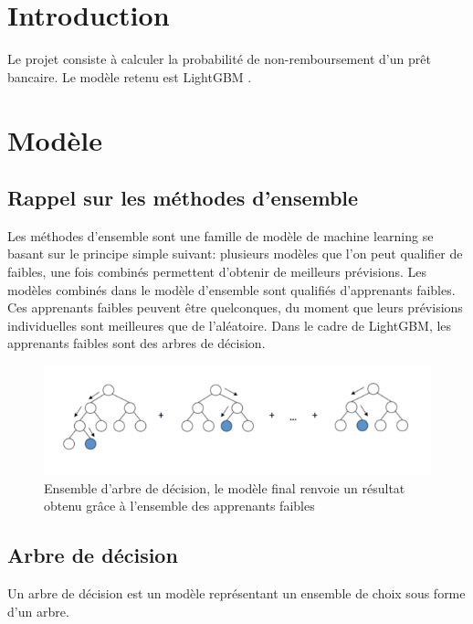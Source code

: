 
\section{Introduction}
	Le projet consiste à calculer la probabilité de non-remboursement d'un prêt bancaire.
	Le modèle retenu est LightGBM \cite{NIPS2017_6907}.
	

\section{Modèle}
	
	\subsection{Rappel sur les méthodes d'ensemble}
		Les méthodes d'ensemble sont une famille de modèle de machine learning se basant sur
		le principe simple suivant: plusieurs modèles que l'on peut qualifier de faibles, une fois combinés
		permettent d'obtenir de meilleurs prévisions. \cite{geron2017hands-on} \cite{scikit-learn} Les modèles combinés dans le modèle d'ensemble
		sont qualifiés d'apprenants faibles. Ces apprenants faibles peuvent être quelconques,
		du moment que leurs prévisions individuelles sont meilleures que de l'aléatoire.
		Dans le cadre de LightGBM, les apprenants faibles sont des arbres de décision.
		
		\begin{figure}
		\includegraphics[width=\linewidth]{./figs/Boosting.png}
		\caption{Ensemble d'arbre de décision, le modèle final renvoie un 
				 résultat obtenu grâce à l'ensemble des apprenants faibles}
		\end{figure}
		
	\subsection{Arbre de décision}
		Un arbre de décision est un modèle représentant un ensemble de choix sous forme
		d'un arbre. 
		
